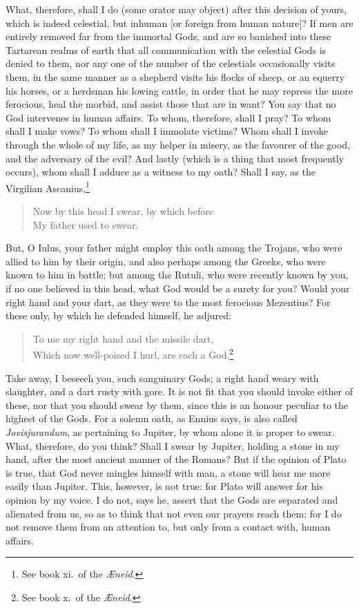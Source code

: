 \documentclass[twoside]{article}
\begin{document}
What, therefore, shall I do (some orator may object) after this decision of
yours, which is indeed celestial, but inhuman [or foreign from human nature]?
If men are entirely removed far from the immortal Gods, and are so banished
into these Tartarean realms of earth that all communication with the celestial
Gods is denied to them, nor any one of the number of the celestials
occasionally visits them, in the same manner as a shepherd visits his flocks of
sheep, or an equerry his horses, or a herdsman his lowing cattle, in order that
he may repress the more ferocious, heal the morbid, and assist those that are
in want? You say that no God intervenes in human affairs. To whom, therefore,
shall I pray? To whom shall I make vows? To whom shall I immolate victims? Whom
shall I invoke through the whole of my life, as my helper in misery, as the
favourer of the good, and the adversary of the evil? And lastly (which is a
thing that most frequently occurs), whom shall I adduce as a witness to my
oath? Shall I say, as the Virgilian Ascanius,\footnote{See book xi.~of the
\textit{{\AE}neid}.}

\begin{verse}
Now by this head I swear, by which before\\
My father used to swear.
\end{verse}

\noindent But, O Iulus, your father might employ this oath among the Trojans,
who were allied to him by their origin, and also perhaps among the Greeks, who
were known to him in battle; but among the Rutuli, who were recently known by
you, if no one believed in this head, what God would be a surety for you? Would
your right hand and your dart, as they were to the most ferocious Mezentius?
For these only, by which he defended himself, he adjured:

\begin{verse}
To me my right hand and the missile dart,\\
Which now well-poised I hurl, are each a God.\footnote{See book x.~of the
\textit{{\AE}neid}.}
\end{verse}

\noindent Take away, I beseech you, such sanguinary Gods; a right hand weary
with slaughter, and a dart rusty with gore. It is not fit that you should
invoke either of these, nor that you should swear by them, since this is an
honour peculiar to the highest of the Gods. For a solemn oath, as Ennius says,
is also called \textit{Jovisjurandum}, as pertaining to Jupiter, by whom alone
it is proper to swear. What, therefore, do you think? Shall I swear by Jupiter,
holding a stone in my hand, after the most ancient manner of the Romans? But if
the opinion of Plato is true, that God never mingles himself with man, a stone
will hear me more easily than Jupiter. This, however, is not true: for Plato
will answer for his opinion by my voice. I do not, says he, assert that the
Gods are separated and alienated from us, so as to think that not even our
prayers reach them; for I do not remove them from an attention to, but only
from a contact with, human affairs.
\end{document}
